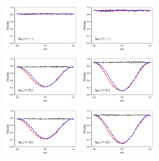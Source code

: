 \documentclass[a4paper]{article}
\begin{document}
\begin{figure}[H]
	\\
	\includegraphics[width=0.35\textwidth]{fidelity_qc5_mit1_state3}
	\includegraphics[width=0.35\textwidth]{fidelity_qc5_mit0_state3}
	\\
	\includegraphics[width=0.35\textwidth]{fidelity_qc5_mit1_state4}
	\includegraphics[width=0.35\textwidth]{fidelity_qc5_mit0_state4}
	\\
	\includegraphics[width=0.35\textwidth]{fidelity_qc5_mit1_state5}
	\includegraphics[width=0.35\textwidth]{fidelity_qc5_mit0_state5}
\end{figure}
\end{document}
